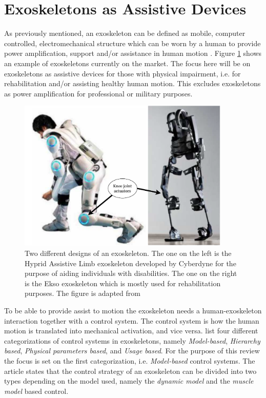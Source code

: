 \documentclass[../main.tex]{subfiles}
\begin{document}

\section{Exoskeletons as Assistive Devices}
\label{sec:A-Exoskeletons}
As previously mentioned, an exoskeleton can be defined as mobile, computer controlled, electromechanical structure which can be worn by a human to provide power amplification, support and/or assistance in human motion \cite{Anam2012, Gorgey2018}.
Figure \ref{fig:exoskeleton} shows an example of exoskeletons currently on the market.
The focus here will be on exoskeletons as assistive devices for those with physical impairment, i.e. for rehabilitation and/or assisting healthy human motion. 
This excludes exoskeletons as power amplification for professional or military purposes.
\begin{figure}[ht]
    \centering
    \includegraphics[width=0.9\textwidth]{img/exoskeleton_fig}
    \caption{Two different designs of an exoskeleton. The one on the left is the Hyprid Assistive Limb exoskeleton developed by Cyberdyne for the purpose of aiding individuals with disabilities. The one on the right is the Ekso exoskeleton which is mostly used for rehabilitation purposes. The figure is adapted from \cite[Fig. 3]{Young2017}}
    \label{fig:exoskeleton}
\end{figure}
To be able to provide assist to motion the exoskeleton needs a human-exoskeleton interaction together with a control system. 
The control system is how the human motion is translated into mechanical activation, and vice versa. 
\textcite{Anam2012} list four different categorizations of control systems in exoskeletons, namely \textit{Model-based}, \textit{Hierarchy based}, \textit{Physical parameters based}, and \textit{Usage based}. 
For the purpose of this review the focus is set on the first categorization, i.e. \textit{Model-based} control systems.
The article states that the control strategy of an exoskeleton can be divided into two types depending on the model used, namely the \textit{dynamic model} and the \textit{muscle model} based control. 
\end{document}
